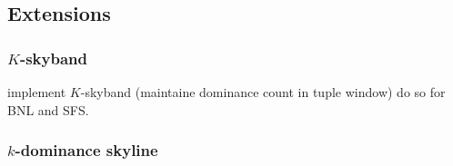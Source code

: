 \subsection{Extensions}

\subsubsection{$K$-skyband}
implement $K$-skyband (maintaine dominance count in tuple window) do so for BNL and SFS.

\subsubsection{$k$-dominance skyline}






